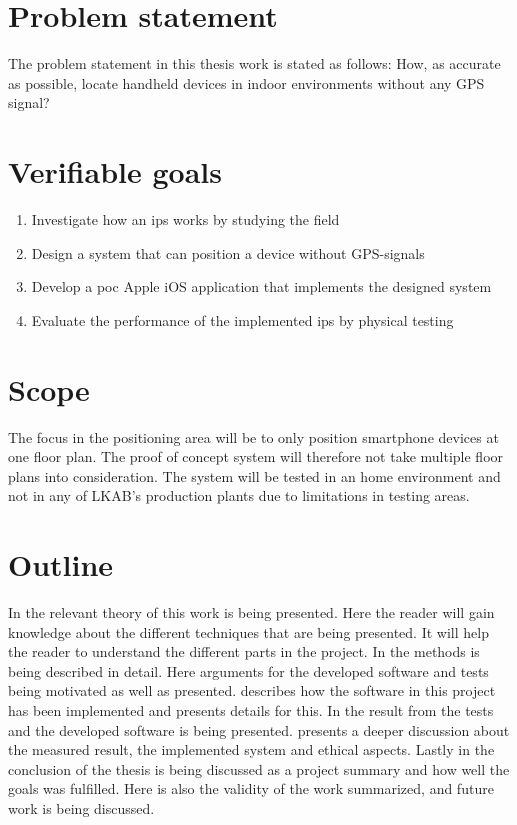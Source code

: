 \section{Problem statement}\label{sec:introProblemStatement}
The problem statement in this thesis work is stated as follows: How, as accurate as possible, locate handheld devices in indoor environments without any GPS signal?

\section{Verifiable goals}\label{sec:introGoals}
\begin{enumerate}
	\item \label{goal:fieldInvestigation}
	Investigate how an \acrfull{ips} works by studying the field

	\item \label{goal:systemDesign}
	Design a system that can position a device without GPS-signals

	\item \label{goal:poc}
	Develop a \acrfull{poc} Apple iOS application that implements the designed system

	\item \label{goal:systemEvaluation}
	Evaluate the performance of the implemented \acrshort{ips} by physical testing
\end{enumerate}


\section{Scope}
The focus in the positioning area will be to only position smartphone devices at one floor plan.
The proof of concept system will therefore not take multiple floor plans into consideration.
The system will be tested in an home environment and not in any of LKAB's production plants due to
limitations in testing areas.


\section{Outline}
In  the relevant theory of this work is being presented.
Here the reader will gain knowledge about the different techniques that are being presented.
It will help the reader to understand the  different parts in the project.
In  the methods is being described in detail.
Here arguments for the developed software and tests being motivated as well as presented.
 describes how the software in this project has been implemented and presents details for this.
In  the result from the tests and the developed software is being presented.
 presents a deeper discussion about the measured result, the implemented system and ethical aspects.
Lastly in  the conclusion of the thesis is being discussed as a project summary and how well the goals was fulfilled.
Here is also the validity of the work summarized, and future work is being discussed.

